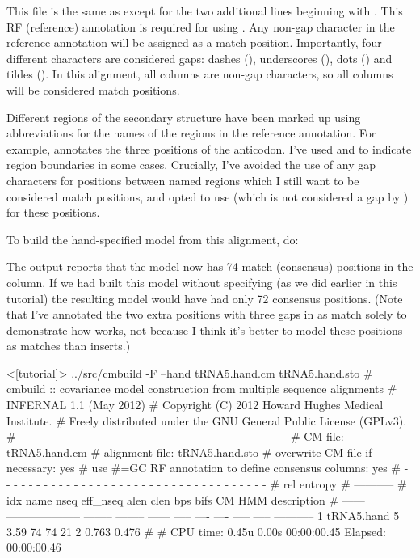 This file is the same as  except for the two
additional lines beginning with . This RF (reference)
annotation is required for using . Any non-gap character
in the reference annotation will be assigned as a match
position. Importantly, four different characters are considered gaps: 
dashes (\ccode{-}), underscores (\ccode{\_}), dots () and
tildes (\ccode{~}). In this alignment, all columns are non-gap
characters, so all columns will be considered match positions. 

Different regions of the secondary structure have been marked up using
abbreviations for the names of the regions in the reference
annotation. For example,  annotates the three positions of
the anticodon. I've used \ccode{[} and \ccode{]} to indicate region
boundaries in some cases. Crucially, I've avoided the use of any gap
characters for positions between named regions which I still want to
be considered match positions, and opted to use \ccode{=} (which is
not considered a gap by ) for these positions.

To build the hand-specified model from this alignment, do:


The output reports that the model now has 74 match (consensus)
positions in the  column. If we had built this model
without specifying  (as we did earlier in this tutorial)
the resulting model would have had only 72 consensus positions.
(Note that I've annotated the two extra positions with three gaps in
 as match solely to demonstrate how
 works, not because I think it's better to model these
positions as matches than inserts.)

\begin{sreoutput}
<[tutorial]> ../src/cmbuild -F --hand tRNA5.hand.cm tRNA5.hand.sto
# cmbuild :: covariance model construction from multiple sequence alignments
# INFERNAL 1.1 (May 2012)
# Copyright (C) 2012 Howard Hughes Medical Institute.
# Freely distributed under the GNU General Public License (GPLv3).
# - - - - - - - - - - - - - - - - - - - - - - - - - - - - - - - - - - - -
# CM file:                                            tRNA5.hand.cm
# alignment file:                                     tRNA5.hand.sto
# overwrite CM file if necessary:                     yes
# use #=GC RF annotation to define consensus columns: yes
# - - - - - - - - - - - - - - - - - - - - - - - - - - - - - - - - - - - -
#                                                                      rel entropy
#                                                                      -----------
# idx    name                     nseq eff_nseq   alen  clen  bps bifs    CM   HMM description
# ------ -------------------- -------- -------- ------ ----- ---- ---- ----- ----- -----------
       1 tRNA5.hand                  5     3.59     74    74   21    2 0.763 0.476 
#
# CPU time: 0.45u 0.00s 00:00:00.45 Elapsed: 00:00:00.46
\end{sreoutput}

